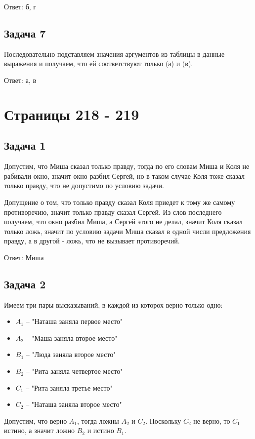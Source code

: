 \documentclass[12pt, a4paper]{article}
\begin{document}
  Ответ: б, г


  \subsection{Задача 7}
  Последовательно подставляем значения аргументов из таблицы в данные выражения 
  и получаем, что ей соответствуют только (а) и (в).

  Ответ: а, в


  \section{Страницы 218 - 219}

  \subsection{Задача 1}
  Допустим, что Миша сказал только правду, тогда по его словам Миша и Коля не рабивали 
  окно, значит окно разбил Сергей, но в таком случае Коля тоже сказал только правду,
  что не допустимо по условию задачи.

  Допущение о том, что только правду сказал Коля приедет к тому же самому противоречию,
  значит только правду сказал Сергей. Из слов последнего получаем, что окно разбил 
  Миша, а Сергей этого не делал, значит Коля сказал только ложь, значит по условию задачи
  Миша сказал в одной числи предложения правду, а в другой - ложь, что не вызывает противоречий.

  Ответ: Миша

  \subsection{Задача 2}
  Имеем три пары высказываний, в каждой из которох верно только одно:

  \begin{itemize}
    \item $ A_1 $ -- "Наташа заняла первое место"
    \item $ A_2 $ -- "Маша заняла второе место"
    \item $ B_1 $ -- "Люда заняла второе место"
    \item $ B_2 $ -- "Рита заняла четвертое место"
    \item $ C_1 $ -- "Рита заняла третье место"
    \item $ C_2 $ -- "Наташа заняла второе место"
  \end{itemize}

  Допустим, что верно $ A_1 $, тогда ложны $ A_2 $ и $ C_2 $. Поскольку $ C_2 $ не верно,
  то $ C_1 $ истино, а значит ложно $ B_2 $ и истино $ B_1 $.
\end{document}
